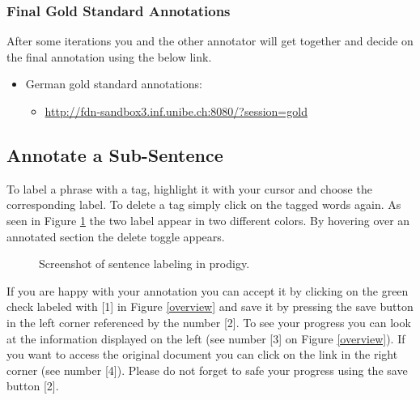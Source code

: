 \documentclass{article}
\begin{document}
\subsubsection{Final Gold Standard Annotations}\label{f_cycle}
After some iterations you and the other annotator will get together and decide on the final annotation using the below link.
\begin{itemize}
\item German gold standard annotations:
\begin{itemize}
\item \href{http://fdn-sandbox3.inf.unibe.ch:8080/?session=gold}{http://fdn-sandbox3.inf.unibe.ch:8080/?session=gold}
\end{itemize}
\end{itemize}


\subsection{Annotate a Sub-Sentence}
To label a phrase with a tag, highlight it with your cursor and choose the corresponding label. To delete a tag simply click on the tagged words again. As seen in Figure \ref{sentence_annotation} the two label appear in two different colors. By hovering over an annotated section the delete toggle appears.

\begin{figure}[H]
     \caption{Screenshot of sentence labeling in prodigy.}
     \label{sentence_annotation}
\end{figure}


If you are happy with your annotation you can accept it by clicking on the green check labeled with [1] in Figure \ref{overview} and save it by pressing the save button in the left corner referenced by the number [2].
To see your progress you can look at the information displayed on the left (see number [3] on Figure \ref{overview}). If you want to access the original document you can click on the link in the right corner (see number [4]). Please do not forget to safe your progress using the save button [2].
\end{document}
